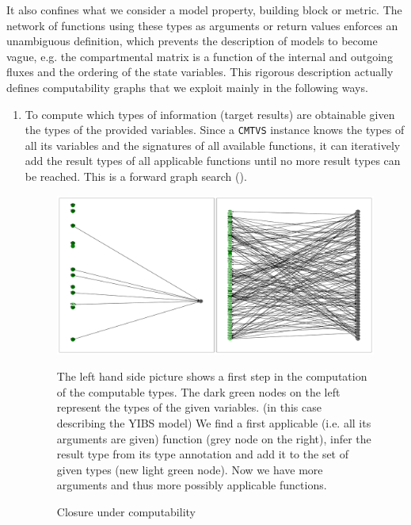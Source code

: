 It also confines what we consider a model property, building block or
metric. The network of functions using these types as arguments or return values
enforces an unambiguous definition, which prevents the description of models to
become vague, e.g. the compartmental matrix is a function of the internal and outgoing fluxes and the ordering of the state variables.  
This rigorous description actually defines computability graphs that we exploit mainly in the following ways.
\begin{enumerate}
  \item
  \label{enum:computable}
  To compute which types of information (target results) are obtainable given the types of the provided variables. 
  Since a \texttt{CMTVS} instance knows the types of all its variables and the signatures of all
  available functions, it can iteratively add the result types of all applicable functions until no
  more result types can be reached. This is a forward graph search ().
    \begin{figure}[h]
      \includegraphics[width=\textwidth]{closure.pdf}
      \caption{Closure under computability} 

      The left hand side picture shows a first step in the computation of the
      computable types.  
      The dark green nodes on the left represent the types of the given variables.
      (in this case describing the YIBS model)
      We find a first applicable (i.e. all its arguments are
      given) function (grey node on the right), infer the result type from its
      type annotation and add it to the set of given types (new light green
      node).  Now we have more arguments and thus more possibly applicable
      functions.


\end{figure}
\end{enumerate}
